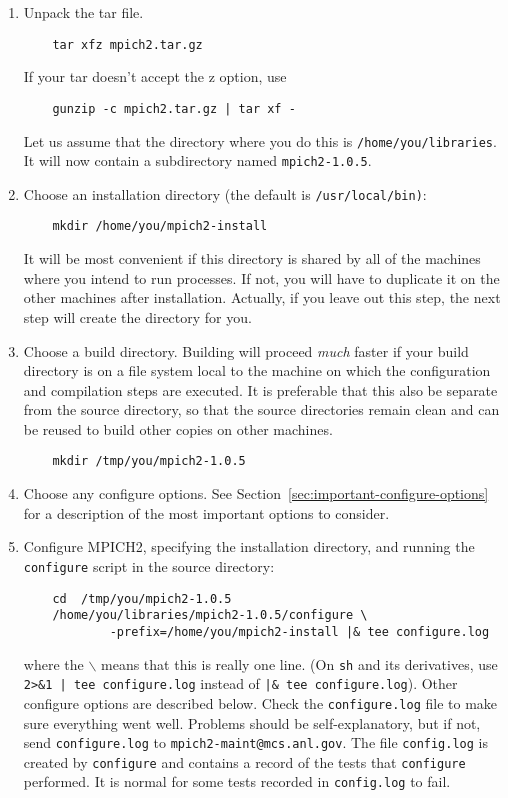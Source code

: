 \documentclass[dvipdfm,11pt]{article}
\begin{document}
\begin{enumerate}
\item 
Unpack the tar file.
\begin{verbatim}
    tar xfz mpich2.tar.gz
\end{verbatim}
If your tar doesn't accept the z option, use
\begin{verbatim}
    gunzip -c mpich2.tar.gz | tar xf -
\end{verbatim}
Let us assume that the directory where you do this is
\texttt{/home/you/libraries}.  It will now contain a subdirectory named
\texttt{mpich2-1.0.5}.

\item
Choose an installation directory (the default is \texttt{/usr/local/bin)}:
\begin{verbatim}
    mkdir /home/you/mpich2-install
\end{verbatim}
It will be most convenient if this directory is shared by all of the
machines where you intend to run processes.  If not, you will have
to duplicate it on the other machines after installation.  Actually, if
you leave out this step, the next step will create the directory for you.

\item
Choose a build directory.  Building will proceed \emph{much} faster if
your build directory is on a file system local to the machine on which
the configuration and compilation steps are executed.  It is preferable
that this also be separate from the source directory, so that the
source directories remain
clean and can be reused to build other copies on other machines.
\begin{verbatim}
    mkdir /tmp/you/mpich2-1.0.5
\end{verbatim}

\item
Choose any configure options.  See
Section~\ref{sec:important-configure-options} for a description of the most
important options to consider.  

\item
Configure MPICH2, specifying the installation directory, and running
the \texttt{configure} script in the source directory:
\begin{verbatim}
    cd  /tmp/you/mpich2-1.0.5
    /home/you/libraries/mpich2-1.0.5/configure \
            -prefix=/home/you/mpich2-install |& tee configure.log
\end{verbatim}
where the \texttt{$\backslash$} means that this is really one line.  (On
\texttt{sh} and its derivatives, use \verb+2>&1 | tee configure.log+
instead of \verb+|& tee configure.log+).  Other configure options are
described below.  Check the \texttt{configure.log} file to make sure
everything went well.  Problems should be self-explanatory, but if not,
send \texttt{configure.log} to \texttt{mpich2-maint@mcs.anl.gov}.
The file \texttt{config.log} is created by \texttt{configure} and
contains a record of the tests that \texttt{configure} performed.  It
is normal for some tests recorded in \texttt{config.log} to fail.  


\end{enumerate}
\end{document}
